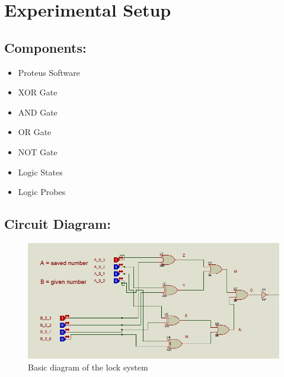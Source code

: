 \documentclass{article}
\begin{document}
\newpage

\section{Experimental Setup}

\subsection{Components:}

\begin{minipage}[t]{0.6\linewidth}
    \begin{itemize}
        \item Proteus Software
        \item XOR Gate
        \item AND Gate
        \item OR Gate
    \end{itemize}
\end{minipage}\hfill
\begin{minipage}[t]{0.6\linewidth}
    \begin{itemize}
        \item NOT Gate
        \item Logic States
        \item Logic Probes
    \end{itemize}
\end{minipage}

\vspace{1cm}

\subsection{Circuit Diagram:}

\begin{figure}[h]
    \centering
    \includegraphics[width=1\textwidth]{diagram.png}
    \caption{\large Basic diagram of the lock system}
\end{figure}
\end{document}
